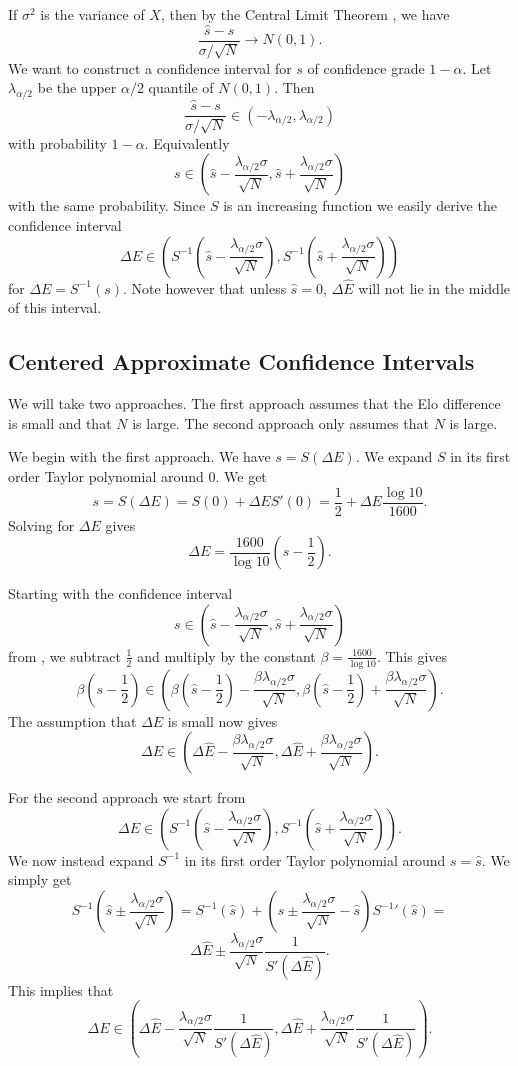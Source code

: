 \documentclass{article}
\theoremstyle{plain}
\theoremstyle{definition}
\begin{document}
If $\sigma^2$ is the variance of $X$, then by the Central Limit Theorem \cite{wikipedia_clt},
we have
$$\frac{\hat s-s}{\sigma/\sqrt{N}}\to N(0,1).$$ We want to construct a confidence interval
for $s$ of confidence grade $1-\alpha$. Let $\lambda_{\alpha/2}$ be the upper $\alpha/2$
quantile of $N(0,1)$. Then $$\frac{\hat s-s}{\sigma/\sqrt{N}}\in\left(-\lambda_{\alpha/2},
\lambda_{\alpha/2}\right)$$ with probability $1-\alpha$. Equivalently $$s\in\left(\hat s-
\frac{\lambda_{\alpha/2}\sigma}{\sqrt{N}},\hat s+\frac{\lambda_{\alpha/2}\sigma}{\sqrt{N}}
\right)$$ with the same probability. Since $S$ is an increasing function we easily derive
the confidence interval
$$\Delta E\in\left(S^{-1}\left(\hat s-\frac{\lambda_{\alpha/2}\sigma}{\sqrt{N}}\right),
S^{-1}\left(\hat s+\frac{\lambda_{\alpha/2}\sigma}{\sqrt{N}}\right)\right)$$
for $\Delta E=S^{-1}(s)$. Note however that unless $\hat s=0$, $\Delta \hat E$ will not
lie in the middle of this interval.

\subsection{Centered Approximate Confidence Intervals}
We will take two approaches. The first approach assumes that the Elo difference is small
and that $N$ is large. The second approach only assumes that $N$ is large.

We begin with the first approach. We have $s=S(\Delta E)$. We expand $S$ in its first
order Taylor polynomial around $0$. We get $$s=S(\Delta E)=S(0)+\Delta ES'(0)=\frac12+
\Delta E\frac{\log10}{1600}.$$ Solving for $\Delta E$ gives
$$\Delta E=\frac{1600}{\log10}\left(s-\frac12\right).$$

Starting with the confidence interval $$s\in\left(\hat s-
\frac{\lambda_{\alpha/2}\sigma}{\sqrt{N}},\hat s+\frac{\lambda_{\alpha/2}\sigma}{\sqrt{N}}
\right)$$ from , we subtract $\frac12$ and multiply by the constant
$\beta=\frac{1600}{\log10}$. This gives
$$\beta\left(s-\frac12\right)\in\left(\beta\left(\hat s-\frac12\right)-
\frac{\beta\lambda_{\alpha/2}\sigma}{\sqrt{N}},\beta\left(\hat s-\frac12\right)+
\frac{\beta\lambda_{\alpha/2}\sigma}{\sqrt{N}}\right).$$ The assumption that $\Delta E$
is small now gives $$\Delta E\in\left(\Delta\hat E-
\frac{\beta\lambda_{\alpha/2}\sigma}{\sqrt{N}},\Delta\hat E+
\frac{\beta\lambda_{\alpha/2}\sigma}{\sqrt{N}}\right).$$

For the second approach we start from
$$\Delta E\in\left(S^{-1}\left(\hat s-\frac{\lambda_{\alpha/2}\sigma}{\sqrt{N}}\right),
S^{-1}\left(\hat s+\frac{\lambda_{\alpha/2}\sigma}{\sqrt{N}}\right)\right).$$
We now instead expand $S^{-1}$ in its first order Taylor polynomial around $s=\hat s$.
We simply get $$S^{-1}\left(\hat s\pm\frac{\lambda_{\alpha/2}
\sigma}{\sqrt{N}}\right)=S^{-1}\left(\hat s\right)+\left(\hat s\pm\frac{\lambda_{\alpha/2}
\sigma}{\sqrt{N}}-\hat s\right)S^{-1}{'}\left(\hat s\right)=$$$$
\Delta\hat E\pm\frac{\lambda_{\alpha/2}\sigma}{\sqrt{N}}\frac1{S'\left(\Delta\hat E\right)}.$$
This implies that $$\Delta E\in\left(\Delta\hat E-\frac{\lambda_{\alpha/2}\sigma}{\sqrt{N}}
\frac1{S'\left(\Delta\hat E\right)},\Delta\hat E+\frac{\lambda_{\alpha/2}\sigma}{\sqrt{N}}
\frac1{S'\left(\Delta\hat E\right)}\right).$$



\end{document}
